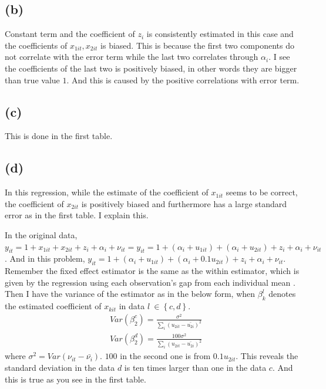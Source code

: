 \documentclass{article}
\begin{document}
\subsection{(b)}
Constant term and the coefficient of $z_i$ is consistently estimated in this case and the coefficients of $x_{1it}, x_{2it}$ is biased. This is because the first two components do not correlate with the error term while the last two correlates through $\alpha_i$. I see the coefficients of the last two is positively biased, in other words they are bigger than true value $1$. And this is caused by the positive correlations with error term.

\subsection{(c)}
This is done in the first table.

\subsection{(d)}
In this regression, while the estimate of the coefficient of $x_{1it}$ seems to be correct, the coefficient of $x_{2it}$ is positively biased and furthermore has a large standard error as in the first table. I explain this.

In the original data, $y_{it} = 1 + x_{1it} + x_{2it} + z_i + \alpha_i + \nu_{it} = y_{it} = 1 + \left( \alpha_i + u_{1it} \right) + \left( \alpha_i + u_{2it} \right) + z_i + \alpha_i + \nu_{it}$. And in this problem, $y_{it} = 1 + \left( \alpha_i + u_{1it} \right) + \left( \alpha_i + 0.1 u_{2it} \right) + z_i + \alpha_i + \nu_{it}$. Remember the fixed effect estimator is the same as the within estimator, which is given by the regression using each observation's gap from each individual mean . Then I have the variance of the estimator as in the below form, when $\beta_k^l$ denotes the estimated coefficient of $x_{kit}$ in data $l\ \in \left\{ c, d\right\}$.
\begin{align*}
	&Var\left( \beta_2^c \right) = \frac{\sigma^2}{\sum_i (u_{2it} - \bar{u_{2i}})^2}\\
	&Var\left( \beta_2^d \right) = \frac{100\sigma^2}{\sum_i (u_{2it} - \bar{u_{2i}})^2}
\end{align*}
where $\sigma^2 = Var(\nu_{it} - \bar{\nu_i})$. $100$ in the second one is from $0.1 u_{2it}$. This reveals the standard deviation in the data $d$ is ten times larger than one in the data $c$. And this is true as you see in the first table.
\end{document}
